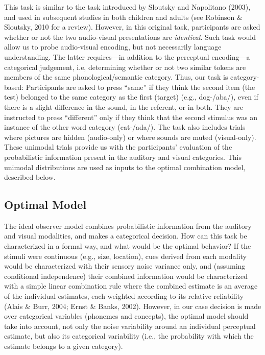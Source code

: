 \documentclass[english,man]{apa6}
\theoremstyle{definition}
\theoremstyle{definition}
\theoremstyle{definition}
\theoremstyle{remark}
\begin{document}
This task is similar to the task introduced by Sloutsky and Napolitano
(2003), and used in subsequent studies in both children and adults (see
Robinson \& Sloutsky, 2010 for a review). However, in this original
task, participants are asked whether or not the two audio-visual
presentations are \emph{identical}. Such task would allow us to probe
audio-visual encoding, but not necessarily language understanding. The
latter requires---in addition to the perceptual encoding---a categorical
judgement, i.e, determining whether or not two similar tokens are
members of the same phonological/semantic category. Thus, our task is
category-based: Participants are asked to press \enquote{same} if they
think the second item (the test) belonged to the same category as the
first (target) (e.g., dog-/aba/), even if there is a slight difference
in the sound, in the referent, or in both. They are instructed to press
\enquote{different} only if they think that the second stimulus was an
instance of the other word category (cat-/ada/). The task also includes
trials where pictures are hidden (audio-only) or where sounds are muted
(visual-only). These unimodal trials provide us with the participants'
evaluation of the probabilistic information present in the auditory and
visual categories. This unimodal distributions are used as inputs to the
optimal combination model, described below.

\subsection{Optimal Model}\label{optimal-model}

The ideal observer model combines probabilistic information from the
auditory and visual modalities, and makes a categorical decision. How
can this task be characterized in a formal way, and what would be the
optimal behavior? If the stimuli were continuous (e.g., size, location),
cues derived from each modality would be characterized with their
sensory noise variance only, and (assuming conditional independence)
their combined information would be characterized with a simple linear
combination rule where the combined estimate is an average of the
individual estimates, each weighted according to its relative
reliability (Alais \& Burr, 2004; Ernst \& Banks, 2002). However, in our
case decision is made over categorical variables (phonemes and
concepts), the optimal model should take into account, not only the
noise variability around an individual perceptual estimate, but also its
categorical variability (i.e., the probability with which the estimate
belongs to a given category).
\end{document}
